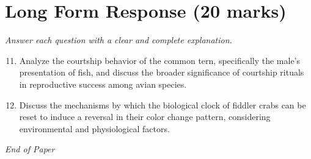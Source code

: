 \documentclass[12pt]{article}
\begin{document}
\section*{Long Form Response (20 marks)}
\textit{Answer each question with a clear and complete explanation.}
\begin{enumerate}[label=\arabic*.]
\setcounter{enumi}{10}
\item Analyze the courtship behavior of the common tern, specifically the male's presentation of fish, and discuss the broader significance of courtship rituals in reproductive success among avian species.
\item Discuss the mechanisms by which the biological clock of fiddler crabs can be reset to induce a reversal in their color change pattern, considering environmental and physiological factors.
\end{enumerate}

\vfill
\noindent\textit{End of Paper}
\end{document}
